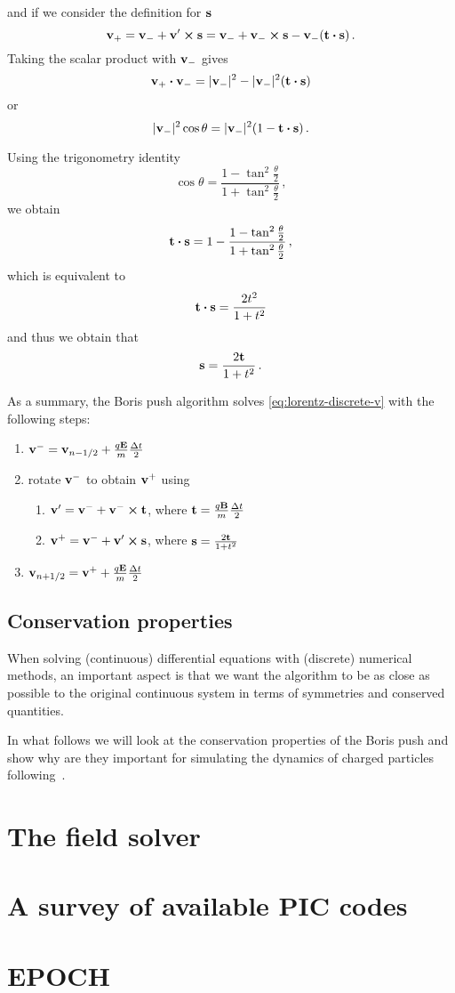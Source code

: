 \documentclass[12pt, class=report, crop=false]{standalone}
\begin{document}
and if we consider the definition for \(\vb{s}\)
\[
\vb{v}_+ = \vb{v}_- + \vb{v}' \cp \vb{s} =
\vb{v}_- + \vb{v}_- \cp \vb{s} - \vb{v}_- (\vb{t} \vdot \vb{s})\,.
\]
Taking the scalar product with \(\vb{v}_-\) gives
\[
\vb{v}_+ \vdot \vb{v}_- = |\vb{v}_-|^2 - |\vb{v}_-|^2 (\vb{t} \vdot \vb{s})
\]
or
\[
|\vb{v}_-|^2 \cos{\theta} = |\vb{v}_-|^2 (1 - \vb{t} \vdot \vb{s})\,.
\]

Using the trigonometry identity
\[
\cos{\theta} = \frac{1-\tan^2{\frac{\theta}{2}}}{1+\tan^2{\frac{\theta}{2}}}\,,
\]
we obtain
\[
\vb{t} \vdot \vb{s} = 1 - \frac{1-\tan^2{\frac{\theta}{2}}}{1+\tan^2{\frac{\theta}{2}}}\,,
\]
which is equivalent to
\[
\vb{t} \vdot \vb{s} = \frac{2 t^2}{1+t^2}
\]
and thus we obtain that
\[
\vb{s} = \frac{2 \vb{t}}{1+t^2}\,.
\]

As a summary, the Boris push algorithm solves \cref{eq:lorentz-discrete-v} with the following steps:
\begin{enumerate}
  \item \(\vb{v}^- = \vb{v}_{n-1/2} + \frac{q \vb{E}}{m} \frac{\Delta t}{2}\)
  \item rotate \(\vb{v}^-\) to obtain \(\vb{v}^+\) using
  \begin{enumerate}
    \item \(\vb{v}' = \vb{v}^- + \vb{v}^- \cp \vb{t}\), where \(\vb{t} = \frac{q \vb{B}}{m} \frac{\Delta t}{2}\)
    \item \(\vb{v}^+ = \vb{v}^- + \vb{v}' \cp \vb{s}\), where \(\vb{s} = \frac{2 \vb{t}}{1+t^2}\)
  \end{enumerate}
  \item \(\vb{v}_{n+1/2} = \vb{v}^+ + \frac{q \vb{E}}{m} \frac{\Delta t}{2}\)
\end{enumerate}

\subsection{Conservation properties}

When solving (continuous) differential equations with (discrete) numerical methods,
an important aspect is that we want the algorithm to be as close as possible to
the original continuous system in terms of symmetries and conserved quantities.

In what follows we will look at the conservation properties of the Boris push
and show why are they important for simulating the dynamics of charged particles
following~\textcite{qin_whyboris_2013}.

\section{The field solver}

\section{A survey of available PIC codes}

\section{EPOCH}
\end{document}
